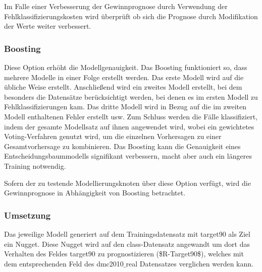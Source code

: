 \documentclass[a4paper,12pt]{article}
\begin{document}
\par
\vspace{0.2cm}
Im Falle einer Verbesserung der Gewinnprognose durch Verwendung der Fehlklassifizierungskosten wird überprüft ob sich die Prognose durch Modifikation der Werte weiter verbessert.

\subsubsection{Boosting}

Diese Option erhöht die Modellgenauigkeit. Das Boosting funktioniert
so, dass mehrere Modelle in einer Folge erstellt werden. Das erste Modell wird auf die übliche Weise
erstellt. Anschließend wird ein zweites Modell erstellt, bei dem besonders die Datensätze berücksichtigt
werden, bei denen es im ersten Modell zu Fehlklassifizierungen kam. Das dritte Modell wird in Bezug
auf die im zweiten Modell enthaltenen Fehler erstellt usw. Zum Schluss werden die Fälle klassifiziert,
indem der gesamte Modellsatz auf ihnen angewendet wird, 
wobei ein gewichtetes Voting-Verfahren genutzt wird, um die einzelnen Vorhersagen zu einer Gesamtvorhersage zu kombinieren.
 Das Boosting kann die Genauigkeit eines Entscheidungsbaummodells signifikant verbessern, macht aber auch ein
längeres Training notwendig.
\par
\vspace{0.2cm}
Sofern der zu testende Modellierungsknoten über diese Option verfügt, wird die Gewinnprognose  in Abhängigkeit von Boosting betrachtet.

\subsubsection{Umsetzung}
Das jeweilige Modell generiert auf dem Trainingsdatensatz mit target90 als Ziel ein Nugget. Diese Nugget wird auf den class-Datensatz angewandt um dort das Verhalten des Feldes target90 zu prognostizieren (\$R-Target90\$), welches mit dem entsprechenden Feld des dmc2010$\_$real Datensatzes verglichen werden kann.
\end{document}
